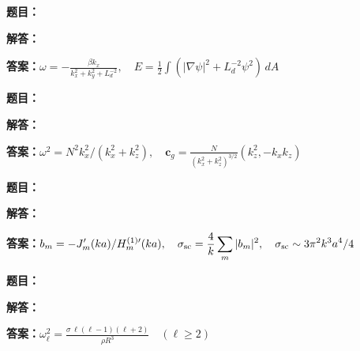 \documentclass[lang=cn,color=blue,11pt]{elegantbook}
\begin{document}
\par\smallskip\noindent\hrulefill\par\medskip
{}\par
\noindent\textbf{题目：}
\par\noindent\textbf{解答：}
\par\noindent\textbf{答案：}\(\displaystyle \omega=-\frac{\beta k_x}{k_x^2+k_y^2+L_d^{-2}},\quad E=\frac12\int(|\nabla\psi|^2+L_d^{-2}\psi^2)\,dA\)\par
\par\smallskip\noindent\hrulefill\par\medskip
{}\par
\noindent\textbf{题目：}
\par\noindent\textbf{解答：}
\par\noindent\textbf{答案：}\(\displaystyle \omega^2=N^2k_x^2/(k_x^2+k_z^2),\quad \boldsymbol c_g=\frac{N}{(k_x^2+k_z^2)^{3/2}}(k_z^2,-k_xk_z)\)\par
\par\smallskip\noindent\hrulefill\par\medskip
{}\par
\noindent\textbf{题目：}
\par\noindent\textbf{解答：}
\par\noindent\textbf{答案：}\(\displaystyle b_m=-J_m'(ka)/H_m^{(1)\prime}(ka),\quad \sigma_{\rm sc}=\frac4k\sum_m|b_m|^2,\quad \sigma_{\rm sc}\sim3\pi^2 k^3a^4/4\)\par
\par\smallskip\noindent\hrulefill\par\medskip
{}\par
\noindent\textbf{题目：}
\par\noindent\textbf{解答：}
\par\noindent\textbf{答案：}\(\displaystyle \omega_\ell^2=\frac{\sigma\,\ell(\ell-1)(\ell+2)}{\rho R^3}\quad(\ell\ge2)\)\par
\end{document}

